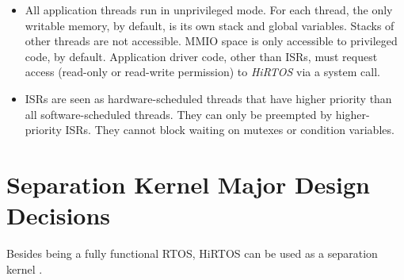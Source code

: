 \documentclass[11pt,letterpaper,twoside,openany]{book}
\begin{document}
\begin{itemize}
\item
All application threads run in unprivileged mode. For each thread, the only writable memory,
by default, is its own stack and global variables. Stacks of other threads are not accessible.
MMIO space is only accessible to privileged code, by default. Application driver code, other
than ISRs, must request access (read-only or read-write permission) to \emph{HiRTOS} via a
system call.

\item ISRs are seen as hardware-scheduled threads that have higher priority than all software-scheduled
threads. They can only be preempted by higher-priority ISRs. They cannot block waiting on mutexes or
condition variables.

\end{itemize}

\section{Separation Kernel Major Design Decisions}

Besides being a fully functional RTOS, HiRTOS can be used as a separation kernel \cite{SepK1, SepK2}.
\end{document}
